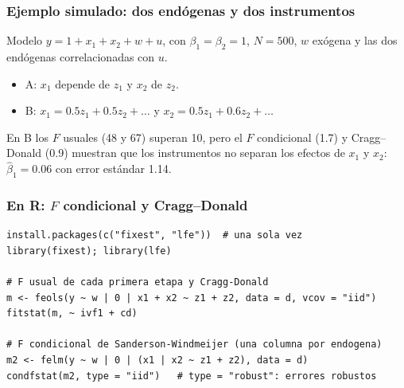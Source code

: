 \documentclass[t, compress, spanish, aspectratio=169]{beamer}
\begin{document}
\begin{frame}
    \frametitle{Ejemplo simulado: dos end\'ogenas y dos instrumentos}
    \small
    Modelo $y=1+x_1+x_2+w+u$, con $\beta_1=\beta_2=1$, $N=500$, $w$ ex\'ogena y las dos end\'ogenas correlacionadas con $u$.
    \begin{itemize}
        \item A: $x_1$ depende de $z_1$ y $x_2$ de $z_2$.
        \item B: $x_1=0.5z_1+0.5z_2+\dots$ y $x_2=0.5z_1+0.6z_2+\dots$
    \end{itemize}
    \begin{center}
    \footnotesize
    
    \end{center}
    En B los $F$ usuales (48 y 67) superan 10, pero el $F$ condicional (1.7) y Cragg--Donald (0.9) muestran que los instrumentos no separan los efectos de $x_1$ y $x_2$: $\hat\beta_1=0.06$ con error est\'andar 1.14.
\end{frame}
\begin{frame}[fragile]
    \frametitle{En R: $F$ condicional y Cragg--Donald}
\footnotesize
\begin{verbatim}
install.packages(c("fixest", "lfe"))  # una sola vez
library(fixest); library(lfe)

# F usual de cada primera etapa y Cragg-Donald
m <- feols(y ~ w | 0 | x1 + x2 ~ z1 + z2, data = d, vcov = "iid")
fitstat(m, ~ ivf1 + cd)

# F condicional de Sanderson-Windmeijer (una columna por endogena)
m2 <- felm(y ~ w | 0 | (x1 | x2 ~ z1 + z2), data = d)
condfstat(m2, type = "iid")   # type = "robust": errores robustos
\end{verbatim}
\end{frame}

\end{document}
